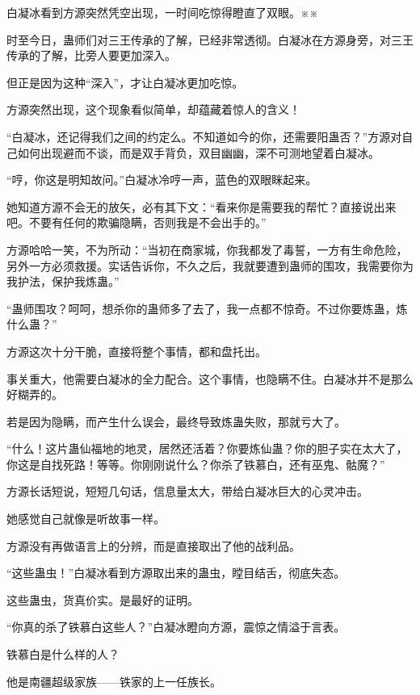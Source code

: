 
\begin{this_body}

白凝冰看到方源突然凭空出现，一时间吃惊得瞪直了双眼。※※

时至今日，蛊师们对三王传承的了解，已经非常透彻。白凝冰在方源身旁，对三王传承的了解，比旁人要更加深入。

但正是因为这种“深入”，才让白凝冰更加吃惊。

方源突然出现，这个现象看似简单，却蕴藏着惊人的含义！

“白凝冰，还记得我们之间的约定么。不知道如今的你，还需要阳蛊否？”方源对自己如何出现避而不谈，而是双手背负，双目幽幽，深不可测地望着白凝冰。

“哼，你这是明知故问。”白凝冰冷哼一声，蓝色的双眼眯起来。

她知道方源不会无的放矢，必有其下文：“看来你是需要我的帮忙？直接说出来吧。不要有任何的欺骗隐瞒，否则我是不会出手的。”

方源哈哈一笑，不为所动：“当初在商家城，你我都发了毒誓，一方有生命危险，另外一方必须救援。实话告诉你，不久之后，我就要遭到蛊师的围攻，我需要你为我护法，保护我炼蛊。”

“蛊师围攻？呵呵，想杀你的蛊师多了去了，我一点都不惊奇。不过你要炼蛊，炼什么蛊？”

方源这次十分干脆，直接将整个事情，都和盘托出。

事关重大，他需要白凝冰的全力配合。这个事情，也隐瞒不住。白凝冰并不是那么好糊弄的。

若是因为隐瞒，而产生什么误会，最终导致炼蛊失败，那就亏大了。

“什么！这片蛊仙福地的地灵，居然还活着？你要炼仙蛊？你的胆子实在太大了，你这是自找死路！等等。你刚刚说什么？你杀了铁慕白，还有巫鬼、骷魔？”

方源长话短说，短短几句话，信息量太大，带给白凝冰巨大的心灵冲击。

她感觉自己就像是听故事一样。

方源没有再做语言上的分辨，而是直接取出了他的战利品。

“这些蛊虫！”白凝冰看到方源取出来的蛊虫，瞠目结舌，彻底失态。

这些蛊虫，货真价实。是最好的证明。

“你真的杀了铁慕白这些人？”白凝冰瞪向方源，震惊之情溢于言表。

铁慕白是什么样的人？

他是南疆超级家族——铁家的上一任族长。


\end{this_body}
